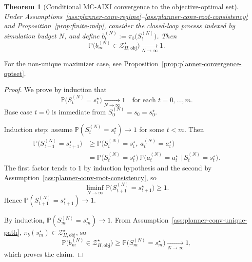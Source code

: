 \documentclass[11pt]{article}
\newtheorem{theorem}{Theorem}
\begin{document}
\begin{theorem}[Conditional MC-AIXI convergence to the objective-optimal set]\label{thm:planner-convergence-mcaixi}
Under Assumptions~\ref{ass:planner-conv-regime}--\ref{ass:planner-conv-root-consistency}
and Proposition~\ref{prop:finite-mdp},
consider the closed-loop process indexed by simulation budget $N$, and define
$b_t^{(N)}:=\pi_b\big(S_t^{(N)}\big)$. Then
\[
\mathbb{P}\!\big(b_m^{(N)}\in\mathcal{Z}_{H,\mathrm{obj}}^{\star}\big)
\xrightarrow[N\to\infty]{}1.
\]
\end{theorem}

For the non-unique maximizer case, see Proposition~\ref{prop:planner-convergence-optset}.

\begin{proof}
We prove by induction that
\[
\mathbb{P}\!\big(S_t^{(N)}=s_t^{\star}\big)\xrightarrow[N\to\infty]{}1
\quad\text{for each }t=0,\dots,m.
\]
Base case $t=0$ is immediate from $S_0^{(N)}=s_0=s_0^{\star}$.

Induction step: assume
$\mathbb{P}(S_t^{(N)}=s_t^{\star})\to 1$ for some $t<m$.
Then
\[
\begin{aligned}
\mathbb{P}\!\big(S_{t+1}^{(N)}=s_{t+1}^{\star}\big)
&\ge
\mathbb{P}\!\big(S_t^{(N)}=s_t^{\star},\ a_t^{(N)}=a_t^{\star}\big)\\
&=
\mathbb{P}\!\big(S_t^{(N)}=s_t^{\star}\big)
\,\mathbb{P}\!\big(a_t^{(N)}=a_t^{\star}\mid S_t^{(N)}=s_t^{\star}\big).
\end{aligned}
\]
The first factor tends to $1$ by induction hypothesis and the second by
Assumption~\ref{ass:planner-conv-root-consistency}, so
\[
\liminf_{N\to\infty}\mathbb{P}\!\big(S_{t+1}^{(N)}=s_{t+1}^{\star}\big)\ge 1.
\]
Hence
$\mathbb{P}(S_{t+1}^{(N)}=s_{t+1}^{\star})\to 1$.

By induction,
$\mathbb{P}(S_m^{(N)}=s_m^{\star})\to 1$.
From Assumption~\ref{ass:planner-conv-unique-path},
$\pi_b(s_m^{\star})\in\mathcal{Z}_{H,\mathrm{obj}}^{\star}$, so
\[
\mathbb{P}\!\big(b_m^{(N)}\in\mathcal{Z}_{H,\mathrm{obj}}^{\star}\big)
\ge
\mathbb{P}\!\big(S_m^{(N)}=s_m^{\star}\big)
\xrightarrow[N\to\infty]{}1,
\]
which proves the claim.
\end{proof}
\end{document}
